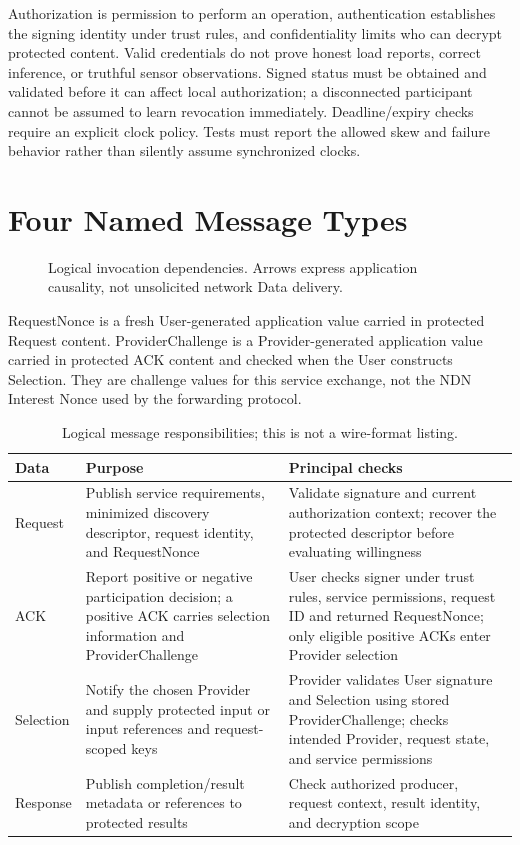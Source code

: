Authorization is permission to perform an operation, authentication establishes the signing identity under trust rules, and confidentiality limits who can decrypt protected content. Valid credentials do not prove honest load reports, correct inference, or truthful sensor observations. Signed status must be obtained and validated before it can affect local authorization; a disconnected participant cannot be assumed to learn revocation immediately. Deadline/expiry checks require an explicit clock policy. Tests must report the allowed skew and failure behavior rather than silently assume synchronized clocks.

\section{Four Named Message Types}
\begin{figure}[H]
\singlespacing
\centering\resizebox{\linewidth}{!}{}
\caption{Logical invocation dependencies. Arrows express application causality, not unsolicited network Data delivery.}
\end{figure}
RequestNonce is a fresh User-generated application value carried in protected Request content. ProviderChallenge is a Provider-generated application value carried in protected ACK content and checked when the User constructs Selection. They are challenge values for this service exchange, not the NDN Interest Nonce used by the forwarding protocol.
\begin{table}[H]
\singlespacing
\centering\small
\caption{Logical message responsibilities; this is not a wire-format listing.}
\begin{tabularx}{\textwidth}{p{}XX}
\toprule
Data & Purpose & Principal checks\\\midrule
Request & Publish service requirements, minimized discovery descriptor, request identity, and RequestNonce & Validate signature and current authorization context; recover the protected descriptor before evaluating willingness\\\midrule
ACK & Report positive or negative participation decision; a positive ACK carries selection information and ProviderChallenge & User checks signer under trust rules, service permissions, request ID and returned RequestNonce; only eligible positive ACKs enter Provider selection\\\midrule
Selection & Notify the chosen Provider and supply protected input or input references and request-scoped keys & Provider validates User signature and Selection using stored ProviderChallenge; checks intended Provider, request state, and service permissions\\\midrule
Response & Publish completion/result metadata or references to protected results & Check authorized producer, request context, result identity, and decryption scope\\\bottomrule
\end{tabularx}
\end{table}

